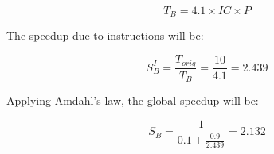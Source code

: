 \begin{equation}
T_{B} = 4.1 \times IC \times P
\end{equation}

The speedup due to instructions will be:

\begin{equation}
S^{I}_{B} = \frac{T_{orig}}{T_{B}} = \frac{10}{4.1} = 2.439
\end{equation}

Applying Amdahl's law, the global speedup will be:

\begin{equation}
S_{B} = \frac{1}{0.1 + \frac{0.9}{2.439}} = 2.132
\end{equation}

